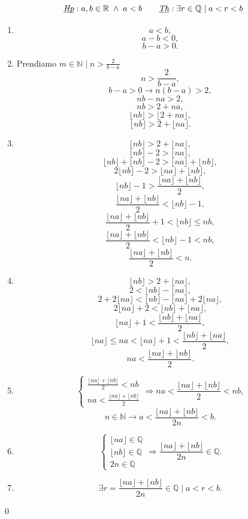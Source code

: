 \[ \underbar{\textit{Hp}}: a,b \in\mathbb{R} \;\land\;  a < b \qquad \underbar{\textit{Th}}: \exists r\in\mathbb{Q} \mid a<r<b \]

\begin{enumerate}[label=(\roman*)]
    \item \[ a < b, \]\[ a - b < 0,\]\[ b-a>0. \]
    \item Prendiamo $m \in\mathbb{N} \mid n > \frac{2}{b-a}$
        \[ n >\frac{2}{b-a}, \]
        \[ b-a>0 \rightarrow n(b-a) > 2, \]
        \[ nb-na > 2, \]
        \[ nb > 2 + na, \]
        \[ \lfloor nb \rfloor > \lfloor 2 + na \rfloor, \]
        \[ \lfloor nb \rfloor > 2 + \lfloor na \rfloor. \]
    \item
        \[ \lfloor nb \rfloor > 2 + \lfloor na \rfloor, \]
        \[ \lfloor nb \rfloor -2> \lfloor na \rfloor, \]
        \[ \lfloor nb \rfloor+\lfloor nb \rfloor -2> \lfloor na \rfloor+\lfloor nb \rfloor, \]
        \[ 2\lfloor nb \rfloor -2> \lfloor na \rfloor+\lfloor nb \rfloor, \]
        \[ \lfloor nb \rfloor -1> \frac{\lfloor na \rfloor+\lfloor nb \rfloor}{2}, \]
        \[ \frac{\lfloor na \rfloor+\lfloor nb \rfloor}{2} <\lfloor nb \rfloor -1, \]
        \[ \frac{\lfloor na \rfloor+\lfloor nb \rfloor}{2} +1 <\lfloor nb \rfloor \leq nb, \]
        \[ \frac{\lfloor na \rfloor+\lfloor nb \rfloor}{2} <\lfloor nb \rfloor - 1 < nb, \]
        \[ \frac{\lfloor na \rfloor+\lfloor nb \rfloor}{2} < n. \]
    \item
        \[ \lfloor nb \rfloor > 2 + \lfloor na \rfloor, \]
        \[ 2 < \lfloor nb \rfloor - \lfloor na \rfloor, \]
        \[ 2 + 2\lfloor na \rfloor < \lfloor nb \rfloor - \lfloor na \rfloor + 2\lfloor na \rfloor, \]
        \[ 2\lfloor na \rfloor + 2 < \lfloor nb \rfloor + \lfloor na \rfloor, \]
        \[ \lfloor na \rfloor + 1 < \frac{\lfloor nb \rfloor + \lfloor na \rfloor}{2}, \]
        \[ \lfloor na \rfloor \leq na < \lfloor na \rfloor + 1 < \frac{\lfloor nb \rfloor + \lfloor na \rfloor}{2} ,\]
        \[ na < \frac{\lfloor na \rfloor + \lfloor nb \rfloor}{2}. \]
    \item
        \[
            \begin{cases}
                \frac{\lfloor na \rfloor+\lfloor nb \rfloor}{2} < nb\\
                na < \frac{\lfloor na \rfloor + \lfloor nb \rfloor}{2}
            \end{cases} \Rightarrow 
            na < \frac{\lfloor na \rfloor + \lfloor nb \rfloor}{2} < nb,
        \]\[
            n\in\mathbb{N} \rightarrow a < \frac{\lfloor na \rfloor + \lfloor nb \rfloor}{2n} < b.
        \]
    \item
        \[
            \begin{cases}
                \lfloor na \rfloor \in\mathbb{Q}\\
                \lfloor nb \rfloor \in\mathbb{Q}\\
                2n \in\mathbb{Q}
            \end{cases} \Rightarrow
            \frac{\lfloor na \rfloor + \lfloor nb \rfloor}{2n} \in\mathbb{Q}.
        \]
    
    \item
        \[
            \exists r = \frac{\lfloor na \rfloor + \lfloor nb \rfloor}{2n} \in\mathbb{Q} \mid a < r < b.
        \]
\end{enumerate}
\qed